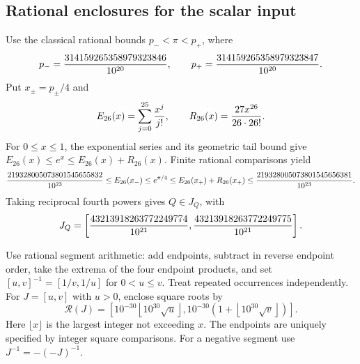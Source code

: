 \documentclass[a4paper,11pt]{article}
\numberwithin{equation}{section}
\theoremstyle{definition}
\theoremstyle{remark}
\begin{document}
\subsection{Rational enclosures for the scalar input}
Use the classical rational bounds $p_-<\pi<p_+$, where
\[
 p_-={314159265358979323846\over10^{20}},\qquad
 p_+={314159265358979323847\over10^{20}}.
\]
Put $x_\pm=p_\pm/4$ and
\[
 E_{26}(x)=\sum_{j=0}^{25}{x^j\over j!},\qquad
 R_{26}(x)={27x^{26}\over26\cdot26!}.
\]
For $0\le x\le1$, the exponential series and its geometric tail bound give
$E_{26}(x)\le e^x\le E_{26}(x)+R_{26}(x)$.
Finite rational comparisons yield
\[
 {219328005073801545655832\over10^{23}}
 \le E_{26}(x_-)
 \le e^{\pi/4}
 \le E_{26}(x_+)+R_{26}(x_+)
 \le {219328005073801545656381\over10^{23}}.
\]
Taking reciprocal fourth powers gives $Q\in J_Q$, with
\begin{equation}\label{eq:fine-Q}
 J_Q=\left[
 {43213918263772249774\over10^{21}},
 {43213918263772249775\over10^{21}}
 \right].
\end{equation}

Use rational segment arithmetic: add endpoints, subtract in reverse endpoint order, take the extrema of the four endpoint products, and set $[u,v]^{-1}=[1/v,1/u]$ for $0<u\le v$. Treat repeated occurrences independently. For $J=[u,v]$ with $u>0$, enclose square roots by
\begin{equation}\label{eq:sqrt-envelope}
 \mathcal R(J)=\left[
 10^{-30}\left\lfloor10^{30}\sqrt u\right\rfloor,
 10^{-30}\left(1+\left\lfloor10^{30}\sqrt v\right\rfloor\right)\right].
\end{equation}
Here $\lfloor x\rfloor$ is the largest integer not exceeding $x$. The endpoints are uniquely specified by integer square comparisons. For a negative segment use $J^{-1}=-(-J)^{-1}$.
\end{document}
